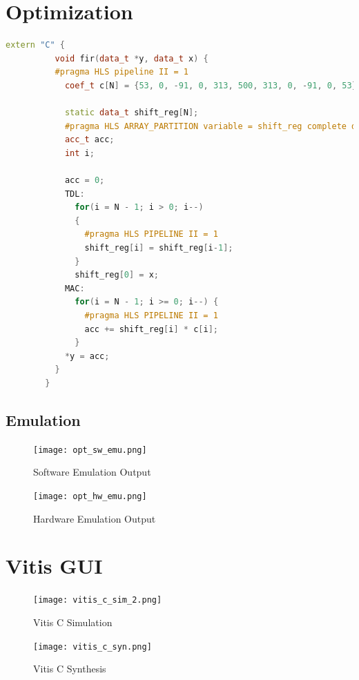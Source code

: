 \documentclass[11pt]{article}
\begin{document}
    \pagebreak[3]
    \section{Optimization}
      \begin{lstlisting}[style=HLSstyle, language=C++]
        extern "C" {
          void fir(data_t *y, data_t x) {
          #pragma HLS pipeline II = 1
            coef_t c[N] = {53, 0, -91, 0, 313, 500, 313, 0, -91, 0, 53};

            static data_t shift_reg[N];
            #pragma HLS ARRAY_PARTITION variable = shift_reg complete dim = 0
            acc_t acc;
            int i;

            acc = 0;
            TDL:
              for(i = N - 1; i > 0; i--)
              {
                #pragma HLS PIPELINE II = 1
                shift_reg[i] = shift_reg[i-1];
              }
              shift_reg[0] = x;
            MAC:
              for(i = N - 1; i >= 0; i--) {
                #pragma HLS PIPELINE II = 1
                acc += shift_reg[i] * c[i];
              }
            *y = acc;
          }
        }
      \end{lstlisting}
      \pagebreak[3]
      \subsection{Emulation}
      \begin{figure}[H]
        \centering
        \texttt{[image: opt\_sw\_emu.png]}
        \caption{Software Emulation Output}
        \label{fig:opt_sw_emu_out}
      \end{figure}
      \begin{figure}[H]
        \centering
        \texttt{[image: opt\_hw\_emu.png]}
        \caption{Hardware Emulation Output}
        \label{fig:opt_hw_emu_out}
      \end{figure}
    \section{Vitis GUI}
      \begin{figure}[H]
        \centering
        \texttt{[image: vitis\_c\_sim\_2.png]}
        \caption{Vitis C Simulation}
        \label{fig:vitis_c_sim}
      \end{figure}
      \begin{figure}[H]
        \centering
        \texttt{[image: vitis\_c\_syn.png]}
        \caption{Vitis C Synthesis}
        \label{fig:vitis_c_syn}
      \end{figure}
\end{document}
